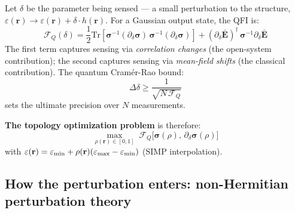 \documentclass[12pt]{article}
\begin{document}
Let $\delta$ be the parameter being sensed --- a small perturbation to
the structure, $\varepsilon(\mathbf{r})\to\varepsilon(\mathbf{r})
+\delta\cdot h(\mathbf{r})$.  For a Gaussian output state, the QFI is:
\begin{equation}
  \mathcal{F}_Q(\delta) =
  \frac{1}{2}\mathrm{Tr}\!\left[\boldsymbol{\sigma}^{-1}
  (\partial_\delta\boldsymbol{\sigma})\,\boldsymbol{\sigma}^{-1}
  (\partial_\delta\boldsymbol{\sigma})\right]
  + (\partial_\delta\bar{\mathbf{E}})^\dagger\,
  \boldsymbol{\sigma}^{-1}\partial_\delta\bar{\mathbf{E}}
  \label{eq:QFI}
\end{equation}
The first term captures sensing via \emph{correlation changes} (the
open-system contribution); the second captures sensing via
\emph{mean-field shifts} (the classical contribution).
The quantum Cram\'{e}r-Rao bound:
\begin{equation}
  \Delta\delta \geq \frac{1}{\sqrt{N\,\mathcal{F}_Q}}
  \label{eq:QCRB}
\end{equation}
sets the ultimate precision over $N$ measurements.

\textbf{The topology optimization problem} is therefore:
\begin{equation}
  \max_{\rho(\mathbf{r})\in[0,1]}
  \;\mathcal{F}_Q\!\bigl[\boldsymbol{\sigma}(\rho),\,
  \partial_\delta\boldsymbol{\sigma}(\rho)\bigr]
  \label{eq:TO_problem}
\end{equation}
with $\varepsilon(\mathbf{r}) = \varepsilon_{\rm min}
+ \rho(\mathbf{r})(\varepsilon_{\rm max}-\varepsilon_{\rm min})$
(SIMP interpolation).

\subsection{How the perturbation enters: non-Hermitian perturbation theory}
\end{document}
